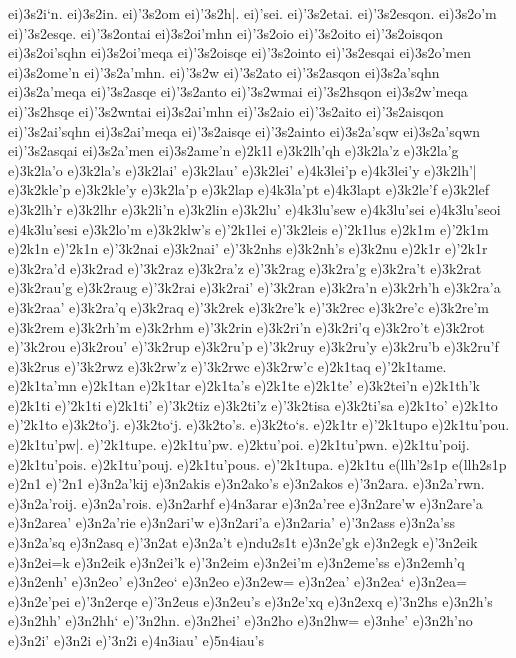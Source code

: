 {ei)3s2i`n.
ei)3s2in.
ei)'3s2om
ei)'3s2h|.
ei)'sei.
ei)'3s2etai.
ei)'3s2esqon.
ei)3s2o'm
ei)'3s2esqe.
ei)'3s2ontai
%
ei)3s2oi'mhn
ei)'3s2oio
ei)'3s2oito
ei)'3s2oisqon
ei)3s2oi'sqhn
ei)3s2oi'meqa
ei)'3s2oisqe
ei)'3s2ointo
%
ei)'3s2esqai
ei)3s2o'men
ei)3s2ome'n
%
ei)'3s2a'mhn.
ei)'3s2w
ei)'3s2ato
ei)'3s2asqon
ei)3s2a'sqhn
ei)3s2a'meqa
ei)'3s2asqe
ei)'3s2anto
%
ei)'3s2wmai
ei)'3s2hsqon
ei)3s2w'meqa
ei)'3s2hsqe
ei)'3s2wntai
%
ei)3s2ai'mhn
ei)'3s2aio
ei)'3s2aito
ei)'3s2aisqon
ei)'3s2ai'sqhn
ei)3s2ai'meqa
ei)'3s2aisqe
ei)'3s2ainto
%
ei)3s2a'sqw
ei)3s2a'sqwn
%
ei)'3s2asqai
ei)3s2a'men
ei)3s2ame'n
%	
e)2k1l
e)3k2lh'qh
e)3k2la'z
e)3k2la'g
e)3k2la'o
e)3k2la's
e)3k2lai'
e)3k2lau'
e)3k2lei'
e)4k3lei'p
e)4k3lei'y
e)3k2lh'|
e)3k2kle'p
e)3k2kle'y
e)3k2la'p
e)3k2lap
e)4k3la'pt
e)4k3lapt
e)3k2le'f
e)3k2lef
e)3k2lh'r
e)3k2lhr
e)3k2li'n
e)3k2lin
e)3k2lu'
e)4k3lu'sew
e)4k3lu'sei
e)4k3lu'seoi
e)4k3lu'sesi
e)3k2lo'm
e)3k2klw's
e)'2k1lei
e)'3k2leis
e)'2k1lus
e)2k1m
e)'2k1m
e)2k1n
e)'2k1n
e)'3k2nai
e)3k2nai'
e)'3k2nhs
e)3k2nh's
e)3k2nu
e)2k1r
e)'2k1r
e)3k2ra'd
e)3k2rad
e)'3k2raz
e)3k2ra'z
e)'3k2rag
e)3k2ra'g
e)3k2ra't
e)3k2rat
e)3k2rau'g
e)3k2raug
e)'3k2rai
e)3k2rai'
e)'3k2ran
e)3k2ra'n
e)3k2rh'h
e)3k2ra'a
e)3k2raa'
e)3k2ra'q
e)3k2raq
e)'3k2rek
e)3k2re'k
e)'3k2rec
e)3k2re'c
e)3k2re'm
e)3k2rem
e)3k2rh'm
e)3k2rhm
e)'3k2rin
e)3k2ri'n
e)3k2ri'q
e)3k2ro't
e)3k2rot
e)'3k2rou
e)3k2rou'
e)'3k2rup
e)3k2ru'p
e)'3k2ruy
e)3k2ru'y
e)3k2ru'b
e)3k2ru'f
e)3k2rus
e)'3k2rwz
e)3k2rw'z
e)'3k2rwc
e)3k2rw'c
e)2k1taq
e)'2k1tame.
e)2k1ta'mn
e)2k1tan
e)2k1tar
e)2k1ta's
e)2k1te
e)2k1te'
e)3k2tei'n
e)2k1th'k
e)2k1ti
e)'2k1ti
e)2k1ti'
e)'3k2tiz
e)3k2ti'z
e)'3k2tisa
e)3k2ti'sa
e)2k1to'
e)2k1to
e)'2k1to
e)3k2to'j.
e)3k2to`j.
e)3k2to's.
e)3k2to`s.
e)2k1tr
e)'2k1tupo
e)2k1tu'pou.
e)2k1tu'pw|.
e)'2k1tupe.
e)2k1tu'pw.
e)2ktu'poi.
e)2k1tu'pwn.
e)2k1tu'poij.
e)2k1tu'pois.
e)2k1tu'pouj.
e)2k1tu'pous.
e)'2k1tupa.
e)2k1tu
e(llh'2s1p
e(llh2s1p
e)2n1
e)'2n1
e)3n2a'kij
e)3n2akis
e)3n2ako's
e)3n2akos
e)'3n2ara.
e)3n2a'rwn.
e)3n2a'roij.
e)3n2a'rois.
e)3n2arhf
e)4n3arar
e)3n2a'ree
e)3n2are'w
e)3n2are'a
e)3n2area'
e)3n2a'rie
e)3n2ari'w
e)3n2ari'a
e)3n2aria'
e)'3n2ass
e)3n2a'ss
e)3n2a'sq
e)3n2asq
e)'3n2at
e)3n2a't
e)ndu2s1t
e)3n2e'gk
e)3n2egk
e)'3n2eik
e)3n2ei=k
e)3n2eik
e)3n2ei'k
e)'3n2eim
e)3n2ei'm
e)3n2eme'ss
e)3n2emh'q
e)3n2enh'
e)3n2eo'
e)3n2eo`
e)3n2eo
e)3n2ew=
e)3n2ea'
e)3n2ea`
e)3n2ea=
e)3n2e'pei
e)'3n2erqe
e)'3n2eus
e)3n2eu's
e)3n2e'xq
e)3n2exq
e)'3n2hs
e)3n2h's
e)3n2hh'
e)3n2hh`
e)'3n2hn.
e)3n2hei'
e)3n2ho
e)3n2hw=
e)3nhe'
e)3n2h'no
e)3n2i'
e)3n2i
e)'3n2i
e)4n3iau'
e)5n4iau's
}
